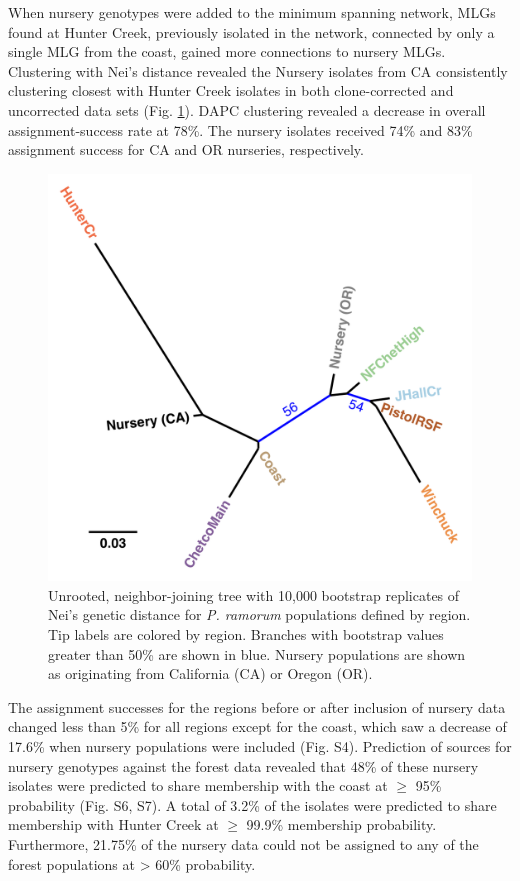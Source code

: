 \documentclass[double,12pt]{beavtex}
\begin{document}
  When nursery genotypes were added to the minimum spanning network, MLGs
  found at Hunter Creek, previously isolated in the network, connected by
  only a single MLG from the coast, gained more connections to nursery
  MLGs. Clustering with Nei's distance revealed the Nursery isolates from
  CA consistently clustering closest with Hunter Creek isolates in both
  clone-corrected and uncorrected data sets (Fig. \ref{fig:ramorum5}).
  DAPC clustering revealed a decrease in overall assignment-success rate
  at 78\%. The nursery isolates received 74\% and 83\% assignment success
  for CA and OR nurseries, respectively.
  
  \begin{figure}
  
  {\centering \includegraphics[width=0.8\linewidth]{figure/phytopathology/figure_5} 
  
  }
  
  \caption[Unrooted, neighbor-joining tree with 10,000 bootstrap replicates of
  Nei's genetic distance for \emph{P. ramorum} populations defined by
  region.]{Unrooted, neighbor-joining tree with 10,000 bootstrap replicates of
  Nei's genetic distance for \emph{P. ramorum} populations defined by
  region. Tip labels are colored by region. Branches with bootstrap values
  greater than 50\% are shown in blue. Nursery populations are shown as
  originating from California (CA) or Oregon (OR).}\label{fig:ramorum5}
  \end{figure}
  
  \newpage
  
  The assignment successes for the regions before or after inclusion of
  nursery data changed less than 5\% for all regions except for the coast,
  which saw a decrease of 17.6\% when nursery populations were included
  (Fig. S4). Prediction of sources for nursery genotypes against the
  forest data revealed that 48\% of these nursery isolates were predicted
  to share membership with the coast at \(\geq\) 95\% probability (Fig.
  S6, S7). A total of 3.2\% of the isolates were predicted to share
  membership with Hunter Creek at \(\geq\) 99.9\% membership probability.
  Furthermore, 21.75\% of the nursery data could not be assigned to any of
  the forest populations at \textgreater{} 60\% probability.
  
\end{document}
